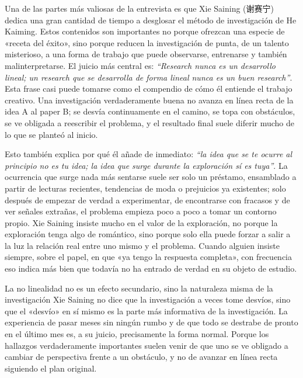 \documentclass[a4paper,12pt]{article}
\begin{document}
Una de las partes más valiosas de la entrevista es que Xie Saining (谢赛宁) dedica una gran cantidad de tiempo a desglosar el método de investigación de He Kaiming. Estos contenidos son importantes no porque ofrezcan una especie de «receta del éxito», sino porque reducen la investigación de punta, de un talento misterioso, a una forma de trabajo que puede observarse, entrenarse y también malinterpretarse. El juicio más central es: \textit{``Research nunca es un desarrollo lineal; un research que se desarrolla de forma lineal nunca es un buen research''}. Esta frase casi puede tomarse como el compendio de cómo él entiende el trabajo creativo. Una investigación verdaderamente buena no avanza en línea recta de la idea A al paper B; se desvía continuamente en el camino, se topa con obstáculos, se ve obligada a reescribir el problema, y el resultado final suele diferir mucho de lo que se planteó al inicio.

Esto también explica por qué él añade de inmediato: \textit{``la idea que se te ocurre al principio no es tu idea; la idea que surge durante la exploración sí es tuya''}. La ocurrencia que surge nada más sentarse suele ser solo un préstamo, ensamblado a partir de lecturas recientes, tendencias de moda o prejuicios ya existentes; solo después de empezar de verdad a experimentar, de encontrarse con fracasos y de ver señales extrañas, el problema empieza poco a poco a tomar un contorno propio. Xie Saining insiste mucho en el valor de la exploración, no porque la exploración tenga algo de romántico, sino porque solo ella puede forzar a salir a la luz la relación real entre uno mismo y el problema. Cuando alguien insiste siempre, sobre el papel, en que «ya tengo la respuesta completa», con frecuencia eso indica más bien que todavía no ha entrado de verdad en su objeto de estudio.

\begin{importantbox}{La no linealidad no es un efecto secundario, sino la naturaleza misma de la investigación}
Xie Saining no dice que la investigación a veces tome desvíos, sino que el «desvío» en sí mismo es la parte más informativa de la investigación. La experiencia de pasar meses sin ningún rumbo y de que todo se destrabe de pronto en el último mes es, a su juicio, precisamente la forma normal. Porque los hallazgos verdaderamente importantes suelen venir de que uno se ve obligado a cambiar de perspectiva frente a un obstáculo, y no de avanzar en línea recta siguiendo el plan original.
\end{importantbox}
\end{document}
